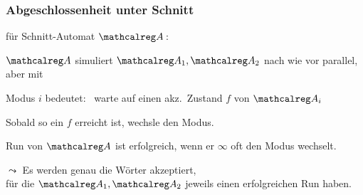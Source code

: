     \begin{frame}
      \frametitle{Abgeschlossenheit unter Schnitt}
      
       für Schnitt-Automat $\Aut{A}$\,:
      \begin{Itemize}
        \item
          $\Aut{A}$ simuliert $\Aut{A}_1,\Aut{A}_2$ nach wie vor parallel,
          aber mit 
          \par\smallskip
        \item
          Modus $i$ bedeutet:~ warte auf einen akz.\ Zustand $f$ von $\Aut{A}_i$
          \par\smallskip
        \item
          Sobald so ein $f$ erreicht ist, wechsle den Modus.
          \par\smallskip
        \item
          Run von $\Aut{A}$ ist erfolgreich, wenn er $\infty$ oft den Modus wechselt.
          \par\smallskip
        \item[$\leadsto$]
          Es werden genau die Wörter akzeptiert,\\
          für die $\Aut{A}_1,\Aut{A}_2$ jeweils einen erfolgreichen Run haben.
      \end{Itemize}
    
    \end{frame}

